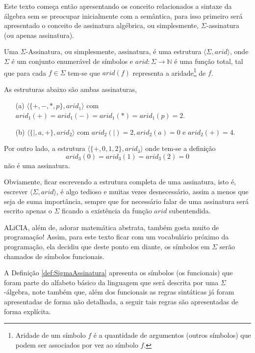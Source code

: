 Este texto começa então apresentando os conceito relacionados a sintaxe da álgebra sem se preocupar inicialmente com a semântica, para isso primeiro será apresentado o conceito de assinatura algébrica, ou simplesmente, $\Sigma$-assinatura (ou apenas assinatura).

\begin{definicao}[Assinatura]\label{def:SigmaAssinatura}
  Uma $\Sigma$-Assinatura, ou simplesmente, assinatura, é uma estrutura $\langle \Sigma, arid \rangle$, onde $\Sigma$ é um conjunto enumerável de símbolos e $arid : \Sigma \rightarrow \mathbb{N}$ é uma função total, tal que para cada $f \in \Sigma$ tem-se que $arid(f)$ representa a aridade\footnote{Aridade de um símbolo $f$ é a quantidade de argumentos (outros símbolos) que podem ser associados por vez ao símbolo $f$.} de $f$.
\end{definicao}

\begin{exemplo}\label{exe:SigmaAssinatura1}
  As estruturas abaixo são ambas assinaturas,
  \begin{itemize}
    \item[(a)] $\langle \{+, -, *, p \}, arid_1 \rangle$ com $arid_1(+) = arid_1(-) = arid_1(*) = arid_1(p) = 2$.
    \item[(b)] $\langle \{|, a, +\}, arid_2 \rangle$ com $arid_2(|) = 2,  arid_2(a) = 0$ e $arid_2(+) = 4$.
  \end{itemize}
  Por outro lado, a estrutura $\langle \{+, 0, 1, 2\}, arid_3 \rangle$ onde tem-se a definição 
  $$arid_3(0) = arid_3(1) = arid_3(2) = 0$$ 
  não é uma assinatura.
\end{exemplo}

Obviamente, ficar escrevendo a estrutura completa de uma assinatura, isto é, escrever $\langle \Sigma, arid \rangle$, é algo tedioso e muitas vezes desnecessário, assim a menos que seja de suma importância, sempre que for necessário falar de uma assinatura será escrito apenas o $\Sigma$ ficando a existência da função $arid$ subentendida.

\begin{nota}[Nomenclatura.]
  ALiCIA, além de, adorar matemática abstrata, também gosta muito de programação! Assim, para este texto ficar com um vocabulário próximo da programação, ela decidiu que deste ponto em diante, os símbolos em $\Sigma$ serão chamados de símbolos funcionais.
\end{nota}

A Definição \ref{def:SigmaAssinatura} apresenta os símbolos (os funcionais) que foram parte do alfabeto básico da linguagem que será descrita por uma $\Sigma$-álgebra, note também que, além dos funcionais as regras sintáticas já foram apresentadas de forma não detalhada, a seguir tais regras são apresentadas de forma explícita.

